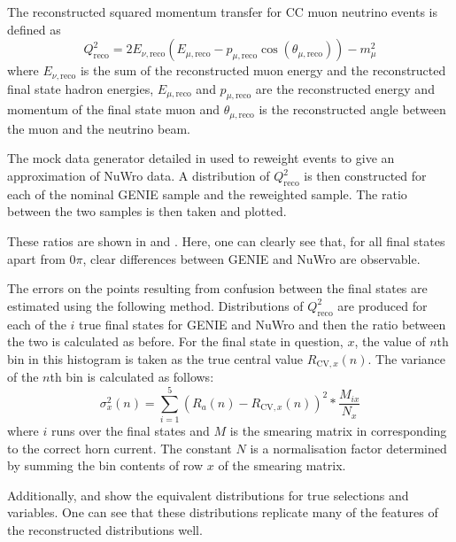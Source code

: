 The reconstructed squared momentum transfer for CC muon neutrino events is defined as
\begin{equation}
Q^{2}_{\textrm{reco}} = 2E_{\nu, \textrm{reco}} \left( E_{\mu, \textrm{reco}} - p_{\mu, \textrm{reco}} \cos \left( \theta_{\mu, \textrm{reco}} \right) \right) - m_{\mu}^{2}
\end{equation}
where $E_{\nu, \textrm{reco}}$ is the sum of the reconstructed muon energy and the reconstructed final state hadron energies, $E_{\mu, \textrm{reco}}$ and $p_{\mu, \textrm{reco}}$ are the reconstructed energy and momentum of the final state muon and $\theta_{\mu, \textrm{reco}}$ is the reconstructed angle between the muon and the neutrino beam.

The mock data generator detailed in  used to reweight events to give an approximation of NuWro data.
A distribution of $Q^{2}_{\textrm{reco}}$ is then constructed for each of the nominal GENIE sample and the reweighted sample. 
The ratio between the two samples is then taken and plotted. 

These ratios are shown in  and . 
Here, one can clearly see that, for all final states apart from $0\pi$, clear differences between GENIE and NuWro are observable.

The errors on the points resulting from confusion between the final states are estimated using the following method.
Distributions of $Q^{2}_{\textrm{reco}}$ are produced for each of the $i$ true final states for GENIE and NuWro and then the ratio between the two is calculated as before.
For the final state in question, $x$, the value of $n$th bin in this histogram is taken as the true central value $R_{\textrm{CV}, x}(n)$.
The variance of the $n$th bin is calculated as follows:
\begin{equation}
	\sigma_{x}^{2}(n) = \sum_{i=1}^{5} \left( R_{a}(n) - R_{\textrm{CV}, x}(n) \right)^{2} * \frac{M_{i x}}{N_{x}}
\end{equation}
where $i$ runs over the final states and $M$ is the smearing matrix in  corresponding to the correct horn current.
The constant $N$ is a normalisation factor determined by summing the bin contents of row $x$ of the smearing matrix. 

Additionally,  and  show the equivalent distributions for true selections and variables. 
One can see that these distributions replicate many of the features of the reconstructed distributions well.

